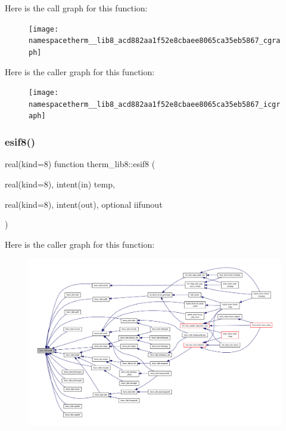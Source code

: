 Here is the call graph for this function\+:
\nopagebreak
\begin{figure}[H]
\begin{center}
\leavevmode
\texttt{[image: namespacetherm\_\_lib8\_acd882aa1f52e8cbaee8065ca35eb5867\_cgraph]}
\end{center}
\end{figure}
Here is the caller graph for this function\+:
\nopagebreak
\begin{figure}[H]
\begin{center}
\leavevmode
\texttt{[image: namespacetherm\_\_lib8\_acd882aa1f52e8cbaee8065ca35eb5867\_icgraph]}
\end{center}
\end{figure}
\mbox{\label{namespacetherm__lib8_a4c2e61543813926681cd581b4c72f0a9}} 
\subsubsection{\texorpdfstring{esif8()}{esif8()}}
{\footnotesize\ttfamily real(kind=8) function therm\+\_\+lib8\+::esif8 (\begin{DoxyParamCaption}\item[{real(kind=8), intent(in)}]{temp,  }\item[{real(kind=8), intent(out), optional}]{iifunout }\end{DoxyParamCaption})}

Here is the caller graph for this function\+:
\nopagebreak
\begin{figure}[H]
\begin{center}
\leavevmode
\includegraphics[width=350pt]{namespacetherm__lib8_a4c2e61543813926681cd581b4c72f0a9_icgraph}
\end{center}
\end{figure}
\mbox{\label{namespacetherm__lib8_a73a640719683dd2b05aba5a87822aa22}} 
